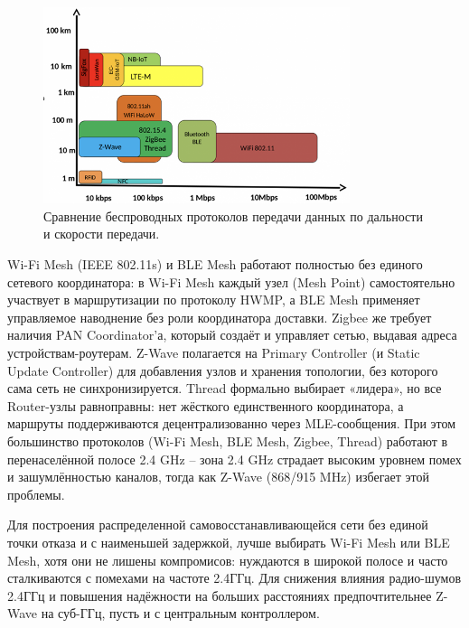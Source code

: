 \documentclass[a4paper,12pt]{article}
\begin{document}
\begin{figure}[h]
    \centering
    \includegraphics[width=0.8\textwidth]{images/Fig07.png}
    \captionsetup{justification=centering}
    \caption{Сравнение беспроводных протоколов передачи данных по дальности и скорости передачи. \cite{IMG_protocol_compare} }
    \label{fig:protocols_range_vs_speed}
\end{figure}


Wi-Fi Mesh (IEEE 802.11s) и BLE Mesh работают полностью без единого сетевого координатора: в Wi-Fi Mesh каждый узел (Mesh Point) самостоятельно участвует в маршрутизации
по протоколу HWMP, а BLE Mesh применяет управляемое наводнение без роли координатора доставки. Zigbee же требует наличия PAN Coordinator’а, который создаёт и управляет
сетью, выдавая адреса устройствам-роутерам. Z-Wave полагается на Primary Controller (и Static Update Controller) для добавления узлов и хранения
топологии, без которого сама сеть не синхронизируется. Thread формально выбирает «лидера», но все Router-узлы равноправны: нет жёсткого единственного
координатора, а маршруты поддерживаются децентрализованно через MLE-сообщения. При этом большинство протоколов (Wi-Fi Mesh, BLE Mesh, Zigbee, Thread) работают в перенаселённой
полосе 2.4 GHz – зона 2.4 GHz страдает высоким уровнем помех и зашумлённостью каналов, тогда как Z-Wave (868/915 MHz) избегает этой проблемы.

Для построения распределенной самовосстанавливающейся сети без единой точки отказа и с наименьшей задержкой, лучше выбирать Wi-Fi Mesh или BLE Mesh, хотя они не лишены
компромисов: нуждаются в широкой полосе и часто сталкиваются с помехами на частоте 2.4ГГц. Для снижения влияния радио-шумов 2.4ГГц и повышения надёжности на больших
расстояниях предпочтительнее Z-Wave на суб-ГГц, пусть и с центральным контроллером.
\end{document}
